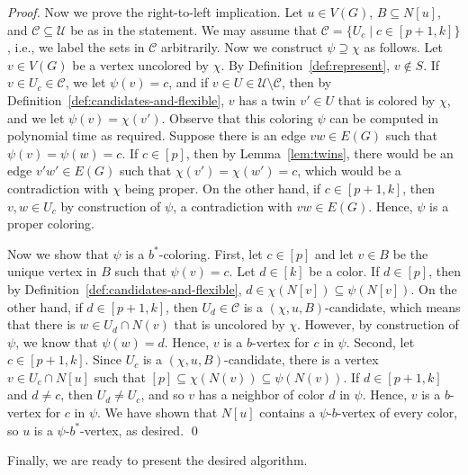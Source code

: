 \documentclass[runningheads, envcountsame]{llncs}
\newcommand{\sep}{\;|\;}
\newcommand{\seq}{\subseteq}
\newcommand{\ca}{\mathcal}
\begin{document}
\begin{proof}
Now we prove the right-to-left implication. Let $u \in V(G)$, $B\seq N[u]$, and $\ca C\seq\ca U$ be as in the statement. We may assume that $\ca C = \{U_c \sep c\in [p+1,k]\}$, i.e., we label the sets in $\ca C$ arbitrarily.
Now we construct $\psi \supseteq \chi$ as follows.
Let $v \in V(G)$ be a vertex uncolored by $\chi$.
By Definition~\ref{def:represent}, $v\notin S$. If $v\in U_c \in\ca C$, we let $\psi(v) = c$, and if $v\in U \in\ca U \setminus\ca C$, then by Definition~\ref{def:candidates-and-flexible}, $v$ has a twin $v'\in U$ that is colored by $\chi$, and we let $\psi(v) = \chi(v')$.
Observe that this coloring $\psi$ can be computed in polynomial time as required.
Suppose there is an edge $vw \in E(G)$ such that $\psi(v) = \psi(w) = c$.
If $c \in [p]$, then by Lemma~\ref{lem:twins}, there would be an edge $v'w' \in E(G)$ such that $\chi(v') = \chi(w') = c$, which would be a contradiction with $\chi$ being proper.
On the other hand, if $c\in[p+1, k]$, then $v,w \in U_{c}$ by construction of $\psi$, a contradiction with $vw \in E(G)$. Hence, $\psi$ is a proper coloring.

Now we show that $\psi$ is a $b^*$-coloring. First, let $c \in [p]$ and let $v \in B$ be the unique vertex in $B$ such that $\psi(v) = c$.
Let $d \in [k]$ be a color. If $d \in [p]$, then by Definition~\ref{def:candidates-and-flexible}, $d \in \chi(N[v]) \seq \psi(N[v])$.
On the other hand, if $d \in [p+1, k]$, then $U_d \in \ca C$ is a $(\chi, u, B)$-candidate, which means that there is $w \in U_d \cap N(v)$ that is uncolored by $\chi$. However, by construction of $\psi$, we know that $\psi(w) = d$. Hence, $v$ is a $b$-vertex for $c$ in $\psi$.
Second, let $c\in [p+1,k]$. Since $U_c$ is a $(\chi, u, B)$-candidate, there is a vertex $v \in U_c \cap N[u]$ such that $[p] \seq \chi(N(v)) \seq \psi(N(v))$. If $d \in [p+1,k]$ and $d \ne c$, then $U_d \ne U_c$, and so $v$ has a neighbor of color $d$ in $\psi$. Hence, $v$ is a $b$-vertex for $c$ in $\psi$.
We have shown that $N[u]$ contains a $\psi$-$b$-vertex of every color, so $u$ is a $\psi$-$b^*$-vertex, as desired.
\qed\end{proof}

Finally, we are ready to present the desired algorithm.
\end{document}
